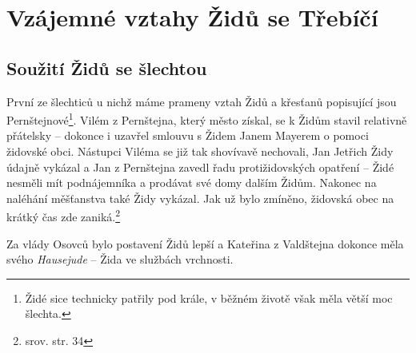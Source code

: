 \documentclass[a4paper,oneside,12pt]{report}
\begin{document}
\chapter{Vzájemné vztahy Židů se Třebíčí}


\section{Soužití Židů se šlechtou}

První ze šlechticů u nichž máme prameny vztah Židů a křesťanů popisující jsou Pernštejnové\footnote{Židé sice technicky patřily pod krále, v běžném životě však měla větší moc šlechta.}.
Vilém z Pernštejna, který město získal, se k Židům stavil relativně přátelsky -- dokonce i uzavřel smlouvu s Židem Janem Mayerem o pomoci židovské obci.
Nástupci Viléma se již tak shovívavě nechovali, Jan Jetřich Židy údajně vykázal a Jan z Pernštejna zavedl řadu protižidovských opatření -- Židé nesměli mít podnájemníka a prodávat své domy dalším Židům.
Nakonec na naléhání měšťanstva také Židy vykázal.
Jak už bylo zmíněno, židovská obec na krátký čas zde zaniká.\footnote{srov. \cite{Fiser2005} str. 34}

Za vlády Osovců bylo postavení Židů lepší a Kateřina z Valdštejna dokonce měla svého \textit{Hausejude} -- Žida ve službách vrchnosti.
\end{document}
